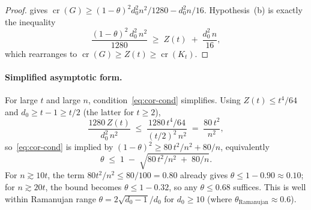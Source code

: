 \documentclass[11pt,a4paper]{article}
\theoremstyle{definition}
\DeclareMathOperator{\crN}{cr}
\begin{document}
\begin{proof}
 gives $\crN(G) \ge (1 - \theta)^{2} d_0^{2} n^{2} / 1280
- d_0^{2} n / 16$. Hypothesis~(b) is exactly the inequality
\[
   \frac{(1 - \theta)^{2}\,d_0^{2}\,n^{2}}{1280} \;\ge\; Z(t) \;+\; \frac{d_0^{2}\,n}{16},
\]
which rearranges to $\crN(G) \ge Z(t) \ge \crN(K_t)$.
\end{proof}

\paragraph{Simplified asymptotic form.}
For large $t$ and large $n$, condition~\eqref{eq:cor-cond} simplifies. Using $Z(t) \le t^{4}/64$ and $d_0 \ge t - 1 \ge t/2$ (the
latter for $t \ge 2$),
\[
   \frac{1280\,Z(t)}{d_0^{2}\,n^{2}} \;\le\; \frac{1280\,t^{4}/64}{(t/2)^{2}\,n^{2}}
                                 \;=\; \frac{80\,t^{2}}{n^{2}},
\]
so~\eqref{eq:cor-cond} is implied by
$(1 - \theta)^{2} \ge 80\,t^{2}/n^{2} + 80/n$, equivalently
\begin{equation}\label{eq:cor-asymp}
   \theta \;\le\; 1 \;-\; \sqrt{80\,t^{2}/n^{2} \;+\; 80/n}.
\end{equation}
For $n \gtrsim 10 t$, the term $80 t^{2}/n^{2} \le 80/100 = 0.80$
already gives $\theta \le 1 - 0.90 \approx 0.10$; for $n \gtrsim
20 t$, the bound becomes $\theta \le 1 - 0.32$, so any
$\theta \le 0.68$ suffices. This is well within Ramanujan range
$\theta = 2\sqrt{d_0 - 1}/d_0$ for $d_0 \ge 10$ (where
$\theta_{\text{Ramanujan}} \approx 0.6$).
\end{document}
